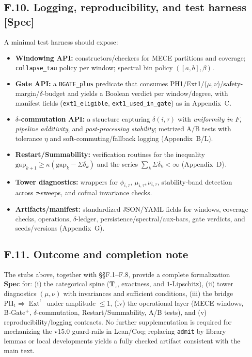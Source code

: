 \documentclass[11pt]{article}
\DeclareMathOperator{\Ext}{Ext}
\DeclareRobustCommand{\hyp}{\nobreakdash-}
\numberwithin{equation}{section}
\theoremstyle{definition}
\begin{document}
\subsection*{F.10. Logging, reproducibility, and test harness [Spec]}
A minimal test harness should expose:
\begin{itemize}
  \item \textbf{Windowing API:} constructors/checkers for MECE partitions and coverage; \texttt{collapse\_tau} policy per window; spectral bin policy \(([a,b],\beta)\).
  \item \textbf{Gate API:} a \texttt{BGATE\_plus} predicate that consumes PH1/Ext1/(\(\mu,\nu\))/safety\hyp margin/\(\delta\)-budget and yields a Boolean verdict per window/degree, with manifest fields (\texttt{ext1\_eligible}, \texttt{ext1\_used\_in\_gate}) as in Appendix~C.
  \item \textbf{\(\delta\)-commutation API:} a structure capturing \(\delta(i,\tau)\) with \emph{uniformity in \(F\)}, \emph{pipeline additivity}, and \emph{post\hyp processing stability}; metrized A/B tests with tolerance \(\eta\) and soft\hyp commuting/fallback logging (Appendix~B/L).
  \item \textbf{Restart/Summability:} verification routines for the inequality \(\mathrm{gap}_{k+1}\ge \kappa(\mathrm{gap}_k-\Sigma\delta_k)\) and the series \(\sum_k\Sigma\delta_k<\infty\) (Appendix~D).
  \item \textbf{Tower diagnostics:} wrappers for \(\phi_{i,\tau}\), \(\mu_{i,\tau},\nu_{i,\tau}\), stability-band detection across \(\tau\)-sweeps, and cofinal invariance checks.
  \item \textbf{Artifacts/manifest:} standardized JSON/YAML fields for windows, coverage checks, operations, \(\delta\)-ledger, persistence/spectral/aux-bars, gate verdicts, and seeds/versions (Appendix~G).
\end{itemize}

\subsection*{F.11. Outcome and completion note}
The stubs above, together with §§F.1–F.8, provide a complete formalization \textbf{Spec} for:
(i) the categorical spine (\(\mathbf{T}_\tau\), exactness, and \(1\)\hyp Lipschitz),
(ii) tower diagnostics \((\mu,\nu)\) with invariances and sufficient conditions,
(iii) the bridge \(\mathrm{PH}_1\Rightarrow \Ext^1\) under amplitude \(\le 1\),
(iv) the operational layer (MECE windows, B\hyp Gate\(^{+}\), \(\delta\)\hyp commutation, Restart/Summability, A/B tests), and
(v) reproducibility/logging contracts.
No further supplementation is required for mechanizing the v15.0 guard-rails in Lean/Coq; replacing \texttt{admit} by library lemmas or local developments yields a fully checked artifact consistent with the main text.
\end{document}
